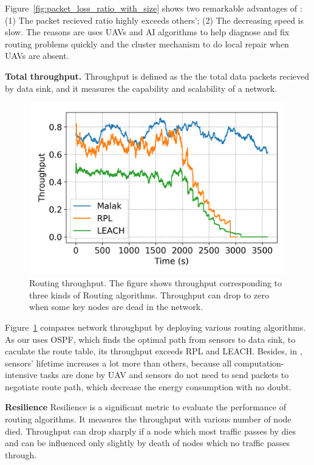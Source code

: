 Figure~\ref{fig:packet_loss_ratio_with_size} shows two remarkable advantages of
{\sdn}: (1) The packet recieved ratio highly exceeds others'; (2) The decreasing
speed is slow. The reasons are {\sdn} uses UAVs and AI algorithms to help
diagnose and fix routing problems quickly and the cluster mechanism to do local
repair when UAVs are absent.

\textbf{Total throughput.}
Throughput is defined as the the total data packets recieved by data sink, and it
measures the capability and scalability of a network.

\begin{figure}[htbp]
	\centering
	\includegraphics[width=.85\columnwidth]{Figure/throughput}
	\vspace{-0.1in}
	\caption{Routing throughput.
		\textnormal{
			The figure shows throughput corresponding to three kinds of Routing
			algorithms. Throughput can drop to zero when some key nodes are dead
			in the network.
		}}
	\label{fig:throughput}
\end{figure}


Figure~\ref{fig:throughput} compares network throughput by deploying various
routing algorithms. As our {\sdn} uses OSPF, which finds the optimal path from
sensors to data sink, to caculate the route table, its throughput exceeds RPL
and LEACH. Besides, in {\sdn}, sensors' lifetime increases a lot more than
others, because all computation-intensive tasks are done by UAV and sensors do
not need to send packets to negotiate route path, which decrease the energy
consumption with no doubt.

\textbf{Resilience}
Resilience  is a significant metric to evaluate the performance of routing
algorithms. It measures the throughput with various number of node died.
Throughput can drop sharply if a node which most traffic passes by dies and can
be influenced only slightly by death of nodes which no traffic passes through.

